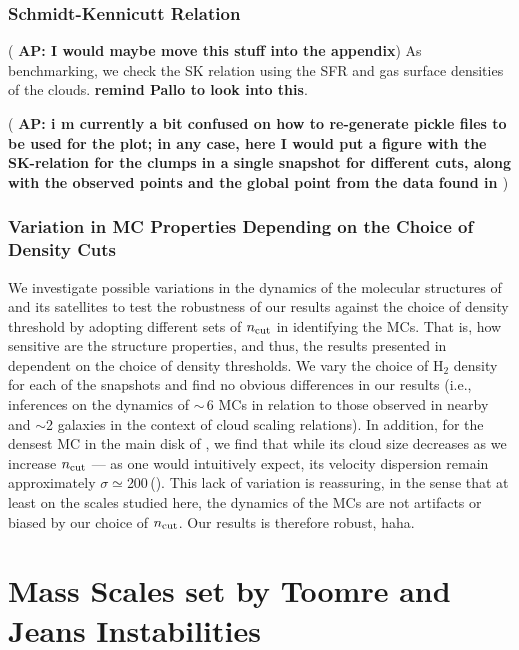 \documentclass[apj]{emulateapj} %
\newcommand{\AP}[1]{({\bf \color{apcolor} AP: #1})}
\begin{document}
{\subsubsection{Schmidt-Kennicutt Relation}
\AP{I would maybe move this stuff into the appendix}
As benchmarking, we check the SK relation using the SFR and gas surface densities of the clouds. {\bf remind Pallo to look into this}.

\AP{i m currently a bit confused on how to re-generate pickle files to be used for the plot; in any case, here I would put a figure with the SK-relation for the clumps in a single snapshot for different cuts, along with the observed points and the global \flower point from the data found in \citet{Pallottini17b}}


\subsubsection{Variation in MC Properties Depending on the Choice of Density Cuts}	 \label{sec:ncut}
We investigate possible variations in the dynamics of the molecular structures of \flower and its satellites
to test
the robustness of our results against the choice of density threshold by adopting
different sets of $n_{\rm cut}$ in identifying the MCs.
That is, how sensitive are the structure properties, and thus, the results presented in 
dependent on the choice of density thresholds.
We vary the choice of H$_2$ density for each of the snapshots and
find no obvious differences in our results (i.e., inferences on the dynamics of \z$\sim$\,6
MCs in relation to those observed in nearby and \z$\sim$2 galaxies in the context of
cloud scaling relations).
In addition, for the densest MC in the main disk of \flower, we find that while
its cloud size decreases as we increase $n_{\rm cut}$ --- as one would intuitively expect,
its velocity dispersion remain
approximately $\sigma\simeq$200\,\kms ().
This lack of variation is reassuring, in the sense that at least on the scales studied here,
the dynamics of the MCs are not artifacts or biased by our choice of $n_{\rm cut}$.
Our results is therefore robust, haha.





\section{Mass Scales set by Toomre and Jeans Instabilities}   \label{sec:Q}

}
\end{document}
